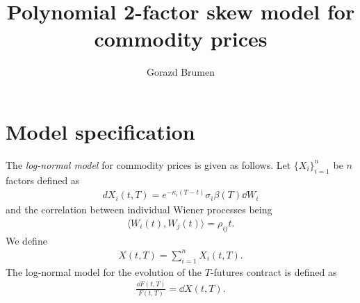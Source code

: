 \documentclass[12pt]{article}
\title{{\bf Polynomial 2-factor skew model for commodity prices}}
\author{Gorazd Brumen}
\begin{document}
\maketitle

\section {Model specification}

The {\it log-normal model} for commodity prices is given as follows. 
Let $\{ X_i \}_{i=1}^n$ be $n$ factors defined as 
\begin {eqnarray*}
  dX_i (t,T) = e^{-\kappa_i  (T - t) } \sigma_i \beta (T) \dd W_i 
\end {eqnarray*}
and the correlation between individual Wiener processes being 
\begin {eqnarray*}
  \langle W_i (t), W_j (t) \rangle = \rho_{ij} t .
\end {eqnarray*}
We define 
\begin {eqnarray}
  X(t,T) = \sum_{i=1}^n X_i (t,T).
  \label {factors}
\end {eqnarray}
The log-normal model for the evolution of the $T$-futures contract 
is defined as 
\begin {eqnarray}
  \frac {\dd F(t,T)} {F(t,T)} = \dd X(t,T).
  \label {F_lognormal}
\end {eqnarray}
\end{document}
